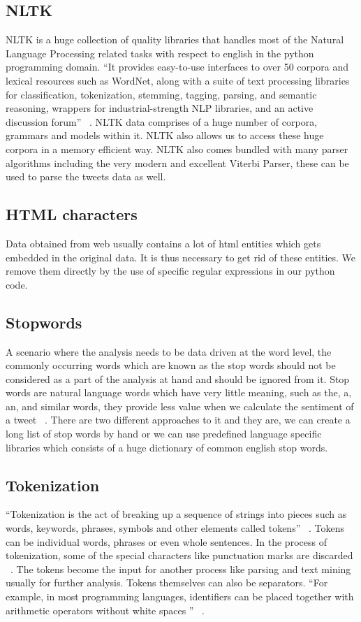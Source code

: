 \subsection{NLTK}
NLTK is a huge collection of quality libraries that handles most of the Natural 
Language Processing related tasks with respect to english in the python programming domain. 
``It provides easy-to-use interfaces to over 50 corpora and lexical resources such as WordNet, 
along with a suite of text processing libraries for classification, tokenization, 
stemming, tagging, parsing, and semantic reasoning, wrappers for industrial-strength 
NLP libraries, and an active discussion forum'' ~\cite{hid-sp18-418-nltk}. NLTK data 
comprises of a huge number of corpora, grammars and models within it. NLTK also allows 
us to access these huge corpora in a memory efficient way. NLTK also comes bundled with 
many parser algorithms including the very modern and excellent Viterbi Parser, these 
can be used to parse the tweets data as well.
 
\subsection{HTML characters}
Data obtained from web usually contains a lot of html entities 
which gets embedded in the original data. It is thus necessary to get rid of 
these entities. We remove them directly by the use of specific regular expressions
in our python code.

\subsection{Stopwords}
A scenario where the analysis needs to be data driven at the word level, the 
commonly occurring words which are known as the stop words should not be considered as a 
part of the analysis at hand and should be ignored from it. Stop words are natural 
language words which have very little meaning, such as the, a, an, and similar words, they 
provide less value when we calculate the sentiment of a tweet ~\cite{hid-sp18-418-stopwords}.
There are two different approaches to it and they are, we can create a long list of stop words by hand or 
we can use predefined language specific libraries which consists of a huge dictionary 
of common english stop words.

\subsection{Tokenization}
``Tokenization is the act of breaking up a sequence of strings into pieces such as 
words, keywords, phrases, symbols and other elements called tokens'' ~\cite{hid-sp18-418-token}. Tokens can be 
individual words, phrases or even whole sentences. In the process of tokenization, 
some of the special characters like punctuation marks are discarded ~\cite{hid-sp18-418-token}. 
The tokens become the input for another process like parsing and text mining usually for further analysis. 
Tokens themselves can also be separators. 
``For example, in most programming languages, identifiers can be placed together 
with arithmetic operators without white spaces '' ~\cite{hid-sp18-418-token}.

